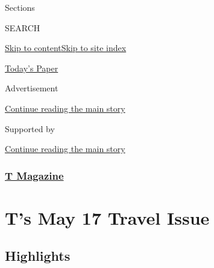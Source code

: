 Sections

SEARCH

\protect\hyperlink{site-content}{Skip to
content}\protect\hyperlink{site-index}{Skip to site index}

\href{https://myaccount.nytimes3xbfgragh.onion/auth/login?response_type=cookie\&client_id=vi}{}

\href{https://www.nytimes3xbfgragh.onion/section/todayspaper}{Today's
Paper}

Advertisement

\protect\hyperlink{after-top}{Continue reading the main story}

Supported by

\protect\hyperlink{after-sponsor}{Continue reading the main story}

\hypertarget{t-magazine}{%
\subsubsection{\texorpdfstring{\href{/section/t-magazine}{T
Magazine}}{T Magazine}}\label{t-magazine}}

\hypertarget{ts-may-17-travel-issue}{%
\section{T's May 17 Travel Issue}\label{ts-may-17-travel-issue}}

\hypertarget{highlights}{%
\subsection{Highlights}\label{highlights}}

